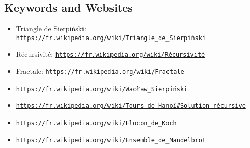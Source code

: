 \documentclass[a4paper,11pt]{report}
\newcommand{\BrochureUrlText}[1]{\texttt{#1}}
\begin{document}
{\raggedright

\subsection*{Keywords and Websites}

\begin{itemize}
  \item Triangle de Sierpiński: \href{https://fr.wikipedia.org/wiki/Triangle_de_Sierpi\%C5\%84ski}{\BrochureUrlText{https://fr.wikipedia.org/wiki/Triangle\_de\_Sierpiński}}
  \item Récursivité: \href{https://fr.wikipedia.org/wiki/R\%C3\%A9cursivit\%C3\%A9}{\BrochureUrlText{https://fr.wikipedia.org/wiki/Récursivité}}
  \item Fractale: \href{https://fr.wikipedia.org/wiki/Fractale}{\BrochureUrlText{https://fr.wikipedia.org/wiki/Fractale}}
  \item \href{https://fr.wikipedia.org/wiki/Wac\%C5\%82aw_Sierpi\%C5\%84ski}{\BrochureUrlText{https://fr.wikipedia.org/wiki/Wacław\_Sierpiński}}
  \item \href{https://fr.wikipedia.org/wiki/Tours_de_Hano\%C3\%AF\#Solution_r\%C3\%A9cursive}{\BrochureUrlText{https://fr.wikipedia.org/wiki/Tours\_de\_Hanoï\#Solution\_récursive}}
  \item \href{https://fr.wikipedia.org/wiki/Flocon_de_Koch}{\BrochureUrlText{https://fr.wikipedia.org/wiki/Flocon\_de\_Koch}}
  \item \href{https://fr.wikipedia.org/wiki/Ensemble_de_Mandelbrot}{\BrochureUrlText{https://fr.wikipedia.org/wiki/Ensemble\_de\_Mandelbrot}}
\end{itemize}


}
\end{document}
